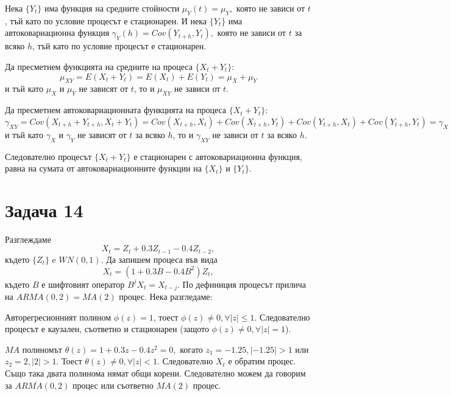 \documentclass{article}
\begin{document}
\begin{flushleft}
\begin{flushleft}
\begin{flushleft}
Нека $\{Y_t \}$ има функция на средните стойности $\mu_Y(t) = \mu_Y,$ която не зависи от $t$, тъй като по условие процесът е стационарен. И нека $\{Y_t \}$ има автоковариационна функция $\gamma_Y(h) = Cov(Y_{t+h}, Y_{t}),$ която не зависи от $t$ за всяко $h$, тъй като по условие процесът е стационарен.
\end{flushleft}

\begin{flushleft}
Да пресметнем функцията на средните на процеса $\{X_t + Y_t \}$: \\
$$\mu_{XY} = E(X_t + Y_t) = E(X_t) + E(Y_t) = \mu_X + \mu_Y$$ и тъй като $\mu_X$ и $\mu_Y$ не зависят от $t$, то и $\mu_{XY}$ не зависи от $t$.
\end{flushleft}
\begin{flushleft}
Да пресметнем автоковариационната функцията на процеса $\{X_t + Y_t \}$: \\
$\gamma_{XY} = Cov(X_{t+h} + Y_{t+h}, X_t + Y_t) = Cov(X_{t+h}, X_{t}) + Cov(X_{t+h}, Y_t) + Cov(Y_{t+h}, X_t) + Cov(Y_{t+h}, Y_t) = \gamma_X + 0 + 0 + \gamma_Y = \gamma_X + \gamma_Y$ \\ 
и тъй като $\gamma_X$ и $\gamma_Y$ не зависят от $t$ за всяко $h$, то и $\gamma_{XY}$ не зависи от $t$ за всяко $h$. 
\end{flushleft}
Следователно процесът $\{X_t + Y_t \}$ е стационарен с автоковариационна функция, равна на сумата от автоковариационните функции на $\{X_t \}$ и $\{Y_t \}$.
\end{flushleft}

\section*{Задача 14}
\begin{flushleft}
Разглеждаме $$X_t = Z_t + 0.3Z_{t-1} - 0.4Z_{t-2},$$ където $\{Z_t \}$ e $WN(0, 1)$. Да запишем процеса във вида $$X_t = (1 + 0.3B - 0.4B^2)Z_t,$$ където $B$ е шифтовият оператор $B^jX_t = X_{t-j}$. По дефиниция процесът прилича на $ARMA(0, 2) = MA(2)$ процес. Нека разгледаме:

\begin{flushleft}
Авторегресионният полином $\phi(z) = 1$, тоест $\phi(z) \neq 0, \forall |z| \leq 1$. Следователно процесът е каузален, съответно и стационарен (защото $\phi(z) \neq 0, \forall |z| = 1$).
\end{flushleft}

\begin{flushleft}
$MA$ полиномът $\theta(z) = 1 + 0.3z - 0.4z^2 = 0,$ когато $z_1 = -1.25, |-1.25| > 1$ или $z_2 = 2, |2| > 1$. Тоест $\theta(z) \neq 0, \forall |z| < 1$. Следователно $X_t$ е обратим процес. Също така двата полинома нямат общи корени. Следователно можем да говорим за $ARMA(0, 2)$ процес или съответно $MA(2)$ процес.
\end{flushleft}


\end{flushleft}
\end{flushleft}
\end{document}
